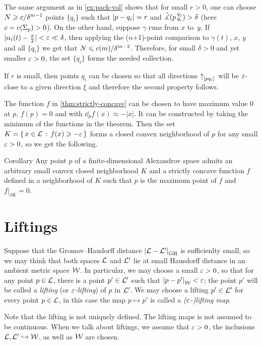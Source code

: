 The same argument as in \ref{ex:pack-vol} shows that for small $r>0$, one can
choose $N\geqslant c/\delta^{m-1}$ points $\{q_i\}$ such that $\dist{p}{q_i}{}=r$
and $\tilde\measuredangle(p\,{}^{q_j}_{q_i})>\delta$ (here $c=c(\Sigma_p)>0$).
On the other hand, suppose $\gamma$ runs from $x$ to~$y$.
If $|\alpha_i(t)- \tfrac\pi2|<\varepsilon\ll\delta$, then applying the ($n$+1)-point comparison to $\gamma(t)$, $x$, $y$ and all $\{q_i\}$ we get that
$N\leqslant c(m)/\delta^{m-2}$. 
Therefore, for small $\delta>0$ and yet smaller $\varepsilon>0$, the set $\{q_i\}$ forms the needed collection.

If $r$ is small, then points $q_i$ can be chosen so that all directions
${\uparrow}_{[{p}{q_i}]_{{}}}$ will be $\varepsilon$-close to a given direction $\xi$ and
therefore the second property follows.
\qeds

The function $f$ in \ref{thm:strictly-concave} can be chosen to have maximum value $0$ at $p$,
$f(p)=0$ and with $\dd_p f(x)\approx-|x|$.
It can be constructed by taking the minimum of the functions in the theorem.
Then the set $K=\left\{\,{x\in\mathcal{L}}\,:\,{f(x)\geqslant -\varepsilon}\,\right\}$ forms a closed convex neighborhood of $p$ for any small $\varepsilon>0$, so we get the following.


\begin{thm}{Corollary}\label{cor:convex-nbhd}
Any point $p$ of a finite-dimensional Alexandrov space admits an arbitrary small convex closed neighborhood $K$ and a strictly concave function $f$ defined in a neighborhood of $K$ such that $p$ is the maximum point of $f$
and $f|_{\partial K}=0$.
\end{thm}

\section{Liftings}

Suppose that the Gromov--Haudorff distance $\dist{\spc{L}}{\spc{L}'}{\GH}$ is sufficienlty small, so we may think that both spaces $\mathcal{L}$ and $\mathcal{L}'$ lie at small Hausdorff distance in an ambient metric space $\mathcal{W}$.
In particular, we may choose a small $\varepsilon>0$, so that for any point $p\in \mathcal{L}$, there is a point $p'\in \mathcal{L}'$ such that $\dist{p}{p'}{\spc{W}}<\eps$;
the point $p'$ will be called a \emph{lifting} (or \emph{$\varepsilon$-lifting}) of $p$ in $\mathcal{L}'$.
We may choose a lifting $p'\in\mathcal{L}'$ for every point $p\in\mathcal{L}$, 
in this case the map $p\mapsto p'$ is called a {}\emph{($\varepsilon$-)lifting map}.

Note that the lifting is not uniquely defined.
The lifting maps is not assumed to be continuous.
When we talk about liftings, we assume that $\varepsilon>0$, the inclusions $\mathcal{L},\mathcal{L}'\hookrightarrow\mathcal{W}$,
as well as $\mathcal{W}$ are chosen.

